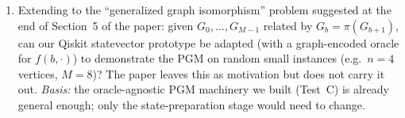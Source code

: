 \documentclass[11pt]{article}
\begin{document}
\begin{enumerate}[label=Q\arabic*.]
        chance of a $0.04$ deviation) or is there a bias from the
        specific choice of $s=3$? \emph{Basis:} the paper claims
        $\Pr(\text{success})$ is independent of $s$, but the operational
        Kraus operators $K_j$ are constructed once and then applied to a
        specific $\rho_s$, so numerical asymmetries in the completion
        of the Naimark unitary could induce $s$-dependence. A
        systematic sweep over all $s\in\mathbb{Z}_N$ would settle it.
  \item Extending to the ``generalized graph isomorphism'' problem
        suggested at the end of Section~5 of the paper: given
        $G_0,\dots,G_{M-1}$ related by $G_b=\pi(G_{b+1})$, can our
        Qiskit statevector prototype be adapted (with a graph-encoded
        oracle for $f(b,\cdot)$) to demonstrate the PGM on random small
        instances (e.g.\ $n=4$ vertices, $M=8$)? The paper leaves this
        as motivation but does not carry it out. \emph{Basis:} the
        oracle-agnostic PGM machinery we built (Test~C) is
        already general enough; only the state-preparation stage would
        need to change.
\end{enumerate}
\end{document}
